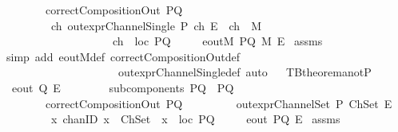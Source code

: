 \begin{isabellebody}
\ \ \ \ \ \ \ \ {\isachardoublequoteopen}correctCompositionOut\ PQ{\isachardoublequoteclose}\isanewline
\ \ \ \ \ \ \ \ {\isachardoublequoteopen}{\isasymexists}\ ch{\isachardot}\ {\isacharparenleft}{\isacharparenleft}out{\isacharunderscore}exprChannelSingle\ P\ ch\ E{\isacharparenright}\ {\isasymand}\ {\isacharparenleft}ch\ {\isasymin}\ M{\isacharparenright}\ \isanewline
\ \ \ \ \ \ \ \ \ \ \ \ \ \ \ \ \ \ \ {\isasymand}\ {\isacharparenleft}ch\ {\isasymin}\ {\isacharparenleft}loc\ PQ{\isacharparenright}{\isacharparenright}{\isacharparenright}{\isachardoublequoteclose}\isanewline
{}\ \ \ \ {\isachardoublequoteopen}{\isasymnot}\ eoutM\ PQ\ M\ E{\isachardoublequoteclose}\isanewline
%
\isadelimproof
%
\endisadelimproof
%
\isatagproof
{}\isamarkupfalse%
\ assms\ \isanewline
{}\isamarkupfalse%
\ {\isacharparenleft}simp\ add{\isacharcolon}\ eoutM{\isacharunderscore}def\ correctCompositionOut{\isacharunderscore}def\ \isanewline
\ \ \ \ \ \ \ \ \ \ \ \ \ \ \ \ \ \ \ \ \ out{\isacharunderscore}exprChannelSingle{\isacharunderscore}def{\isacharcomma}\ auto{\isacharparenright}%
\endisatagproof
{\isafoldproof}%
%
\isadelimproof
\ \isanewline
%
\endisadelimproof
\isanewline
{}\isamarkupfalse%
\ TBtheorem{}a{\isacharunderscore}notP{}{\isacharcolon}\isanewline
{}\ {\isachardoublequoteopen}{\isasymnot}\ eout\ Q\ E{\isachardoublequoteclose}\isanewline
\ \ \ \ \ \ \ \ {\isachardoublequoteopen}subcomponents\ PQ\ {\isacharequal}\ {\isacharbraceleft}P{\isacharcomma}Q{\isacharbraceright}{\isachardoublequoteclose}\isanewline
\ \ \ \ \ \ \ \ {\isachardoublequoteopen}correctCompositionOut\ PQ{\isachardoublequoteclose}\ \isanewline
\ \ \ \ \ \ \ \ {\isachardoublequoteopen}out{\isacharunderscore}exprChannelSet\ P\ ChSet\ E{\isachardoublequoteclose}\isanewline
\ \ \ \ \ \ \ \ {\isachardoublequoteopen}{\isasymforall}\ {\isacharparenleft}x\ {\isacharcolon}{\isacharcolon}chanID{\isacharparenright}{\isachardot}\ {\isacharparenleft}{\isacharparenleft}x\ {\isasymin}\ ChSet{\isacharparenright}\ {\isasymlongrightarrow}\ {\isacharparenleft}x\ {\isasymin}\ {\isacharparenleft}loc\ PQ{\isacharparenright}{\isacharparenright}{\isacharparenright}{\isachardoublequoteclose}\isanewline
{}\ \ \ \ {\isachardoublequoteopen}{\isasymnot}\ eout\ PQ\ E{\isachardoublequoteclose}\isanewline
%
\isadelimproof
%
\endisadelimproof
%
\isatagproof
{}\isamarkupfalse%
\ assms\isanewline
{}\isamarkupfalse%

\end{isabellebody}

